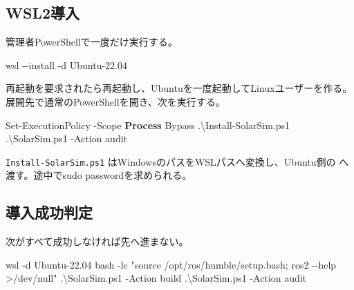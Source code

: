 \documentclass[
  japanese,
  a4paper,
]{article}
\newenvironment{Shaded}{}{}
\newcommand{\ControlFlowTok}[1]{\textcolor[rgb]{0.00,0.44,0.13}{\textbf{#1}}}
\newcommand{\DecValTok}[1]{\textcolor[rgb]{0.25,0.63,0.44}{#1}}
\newcommand{\FunctionTok}[1]{\textcolor[rgb]{0.02,0.16,0.49}{#1}}
\newcommand{\NormalTok}[1]{#1}
\newcommand{\OperatorTok}[1]{\textcolor[rgb]{0.40,0.40,0.40}{#1}}
\newcommand{\StringTok}[1]{\textcolor[rgb]{0.25,0.44,0.63}{#1}}
\begin{document}
\subsection{WSL2導入}\label{wsl2ux5c0eux5165}

管理者PowerShellで一度だけ実行する。

\begin{Shaded}
\begin{Highlighting}[]
\NormalTok{wsl }\OperatorTok{{-}{-}}\NormalTok{install }\OperatorTok{{-}}\NormalTok{d Ubuntu{-}22}\OperatorTok{.}\DecValTok{04}
\end{Highlighting}
\end{Shaded}

再起動を要求されたら再起動し、Ubuntuを一度起動してLinuxユーザーを作る。
展開先で通常のPowerShellを開き、次を実行する。

\begin{Shaded}
\begin{Highlighting}[]
\FunctionTok{Set{-}ExecutionPolicy} \OperatorTok{{-}}\NormalTok{Scope }\ControlFlowTok{Process}\NormalTok{ Bypass}
\OperatorTok{.}\NormalTok{\textbackslash{}Install{-}SolarSim}\OperatorTok{.}\FunctionTok{ps1}
\OperatorTok{.}\NormalTok{\textbackslash{}SolarSim}\OperatorTok{.}\FunctionTok{ps1} \OperatorTok{{-}}\NormalTok{Action audit}
\end{Highlighting}
\end{Shaded}

\texttt{Install-SolarSim.ps1}
はWindowsのパスをWSLパスへ変換し、Ubuntu側の
へ渡す。途中でsudo
passwordを求められる。

\subsection{導入成功判定}\label{ux5c0eux5165ux6210ux529fux5224ux5b9a}

次がすべて成功しなければ先へ進まない。

\begin{Shaded}
\begin{Highlighting}[]
\NormalTok{wsl }\OperatorTok{{-}}\NormalTok{d Ubuntu{-}22}\OperatorTok{.}\DecValTok{04}\NormalTok{ bash }\OperatorTok{{-}}\NormalTok{lc }\StringTok{"source /opt/ros/humble/setup.bash; ros2 {-}{-}help \textgreater{}/dev/null"}
\OperatorTok{.}\NormalTok{\textbackslash{}SolarSim}\OperatorTok{.}\FunctionTok{ps1} \OperatorTok{{-}}\NormalTok{Action build}
\OperatorTok{.}\NormalTok{\textbackslash{}SolarSim}\OperatorTok{.}\FunctionTok{ps1} \OperatorTok{{-}}\NormalTok{Action audit}
\end{Highlighting}
\end{Shaded}
\end{document}
